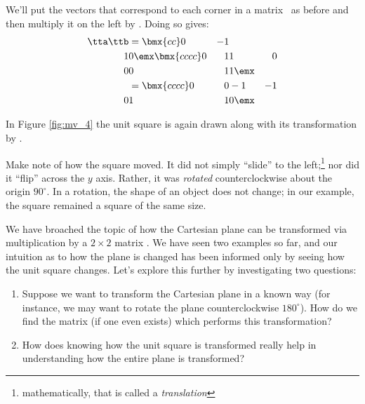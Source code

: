 {We'll put the vectors that correspond to each corner in a matrix \ttb\ as before and then multiply it on the left by \tta. Doing so gives:
\begin{align*}
\tta\ttb &= \bmx{cc}0&-1\\1&0\emx \bmx{cccc}0&1&1&0\\0&0&1&1\emx\\
				& = \bmx{cccc}0 & 0&-1&-1\\0&1&1&0\emx
\end{align*}

In Figure \ref{fig:mv_4} the unit square is again drawn along with its transformation by \tta.

\begin{myfigure}
\begin{center}
\end{center}
\label{fig:mv_4}
\end{myfigure}

Make note of how the square moved. It did not simply ``slide'' to the left;\footnote{mathematically, that is called a \textit{translation}} nor did it ``flip'' across the $y$ axis. Rather, it was \textit{rotated} counterclockwise about the origin $90^\circ$. In a rotation, the shape of an object does not change; in our example, the square remained a square of the same size.
}

\medskip

We have broached the topic of how the Cartesian plane can be transformed via multiplication by a $2\times 2$ matrix \tta. We have seen two examples so far, and our intuition as to how the plane is changed has been informed only by seeing how the unit square changes. Let's explore this further by investigating two questions:
	\begin{enumerate}
	\item		Suppose we want to transform the Cartesian plane in a known way (for instance, we may want to rotate the plane counterclockwise $180^\circ$). How do we find the matrix (if one even exists) which performs this transformation? 
	\item		How does knowing how the unit square is transformed really help in understanding how the entire plane is transformed?
	\end{enumerate}

